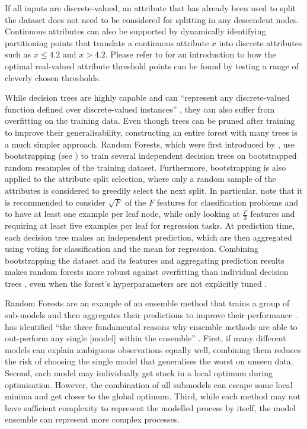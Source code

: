 If all inputs are discrete-valued, an attribute that has already been used to split the dataset does not need to be considered for splitting in any descendent nodes. Continuous attributes can also be supported by dynamically identifying partitioning points that translate a continuous attribute $x$ into discrete attributes such as $x \leq 4.2$ and $x > 4.2$. Please refer to \textcite{continuous-tree-1992} for an introduction to how the optimal real-valued attribute threshold points can be found by testing a range of cleverly chosen thresholds.

\newpar While decision trees are highly capable and can ``represent any discrete-valued function defined over discrete-valued instances'' \cite[p.~76]{machine-learning-1997}, they can also suffer from overfitting on the training data. Even though trees can be pruned after training to improve their generalisability, constructing an entire forest with many trees is a much simpler approach. Random Forests, which were first introduced by \textcite{random-forests-1995}, use bootstrapping (see ) to train several independent decision trees on bootstrapped random resamples of the training dataset. Furthermore, bootstrapping is also applied to the attribute split selection, where only a random sample of the attributes is considered to greedily select the next split. In particular, \textcite{statistical-learning-2009} note that it is recommended to consider $\sqrt{F}$ of the $F$ features for classification problems and to have at least one example per leaf node, while only looking at $\frac{F}{3}$ features and requiring at least five examples per leaf for regression tasks. At prediction time, each decision tree makes an independent prediction, which are then aggregated using voting for classification and the mean for regression. Combining bootstrapping the dataset and its features and aggregating prediction results makes random forests more robust against overfitting than individual decision trees \cite{random-forests-1995}, even when the forest's hyperparameters are not explicitly tuned \cite{ml-hyperparameters-2021}.

\newpar Random Forests are an example of an ensemble method that trains a group of sub-models and then aggregates their predictions to improve their performance \cite{statistical-learning-2009, ensemble-learning-2020}. \textcite{ml-ensembles-2000} has identified ``the three fundamental reasons why ensemble methods are able to out-perform any single [model] within the ensemble'' \cite[p.~13]{ml-ensembles-2000}. First, if many different models can explain ambiguous observations equally well, combining them reduces the risk of choosing the single model that generalises the worst on unseen data. Second, each model may individually get stuck in a local optimum during optimisation. However, the combination of all submodels can escape some local minima and get closer to the global optimum. Third, while each method may not have sufficient complexity to represent the modelled process by itself, the model ensemble can represent more complex processes.

